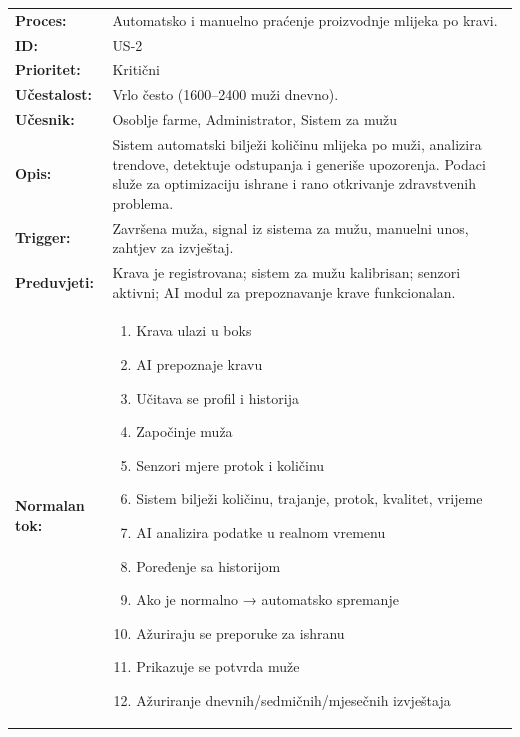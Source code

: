 \documentclass{article}
\begin{document}
\begin{table}[H]
\centering
\small
\begin{tabular}{|p{3.5cm}|p{11cm}|}
\hline
\rowcolor[HTML]{B4C7E7}
\multicolumn{2}{|c|}{\textbf{US-2: Evidencija proizvodnje mlijeka}} \\
\hline
\textbf{Proces:} & Automatsko i manuelno praćenje proizvodnje mlijeka po kravi. \\
\hline
\textbf{ID:} & US-2 \\
\hline
\textbf{Prioritet:} & Kritični \\
\hline
\textbf{Učestalost:} & Vrlo često (1600–2400 muži dnevno). \\
\hline
\textbf{Učesnik:} & Osoblje farme, Administrator, Sistem za mužu \\
\hline
\textbf{Opis:} & Sistem automatski bilježi količinu mlijeka po muži, analizira trendove, detektuje odstupanja i generiše upozorenja. Podaci služe za optimizaciju ishrane i rano otkrivanje zdravstvenih problema. \\
\hline
\textbf{Trigger:} & Završena muža, signal iz sistema za mužu, manuelni unos, zahtjev za izvještaj. \\
\hline
\textbf{Preduvjeti:} & Krava je registrovana; sistem za mužu kalibrisan; senzori aktivni; AI modul za prepoznavanje krave funkcionalan. \\
\hline
\textbf{Normalan tok:} & 
\begin{enumerate}[leftmargin=*, nosep]
    \item Krava ulazi u boks
    \item AI prepoznaje kravu
    \item Učitava se profil i historija
    \item Započinje muža
    \item Senzori mjere protok i količinu
    \item Sistem bilježi količinu, trajanje, protok, kvalitet, vrijeme
    \item AI analizira podatke u realnom vremenu
    \item Poređenje sa historijom
    \item Ako je normalno → automatsko spremanje
    \item Ažuriraju se preporuke za ishranu
    \item Prikazuje se potvrda muže
    \item Ažuriranje dnevnih/sedmičnih/mjesečnih izvještaja
\end{enumerate} \\

\end{tabular}
\end{table}
\end{document}

